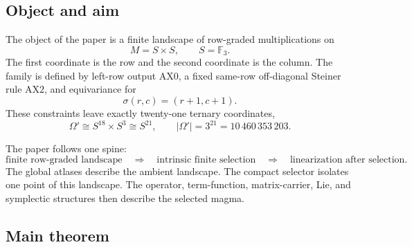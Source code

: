 \documentclass[11pt]{article}
\theoremstyle{definition}
\begin{document}
\subsection{Object and aim}\label{aim}

The object of the paper is a finite landscape of row-graded
multiplications on
\[
M=S\times S,\qquad S=\mathbb F_3.
\]
The first coordinate is the row and the second coordinate is the column.
The family is defined by left-row output \(\mathrm{AX0}\), a fixed
same-row off-diagonal Steiner rule \(\mathrm{AX2}\), and equivariance for
\[
\sigma(r,c)=(r+1,c+1).
\]
These constraints leave exactly twenty-one ternary coordinates,
\[
\Omega'\cong S^{18}\times S^3\cong S^{21},
\qquad |\Omega'|=3^{21}=10\,460\,353\,203.
\]

The paper follows one spine:
\[
\boxed{\text{finite row-graded landscape}}
\quad\Longrightarrow\quad
\boxed{\text{intrinsic finite selection}}
\quad\Longrightarrow\quad
\boxed{\text{linearization after selection}}.
\]
The global atlases describe the ambient landscape.  The compact selector
isolates one point of this landscape.  The operator, term-function,
matrix-carrier, Lie, and symplectic structures then describe the selected
magma.

\subsection{Main theorem}\label{main-theorem}
\end{document}
